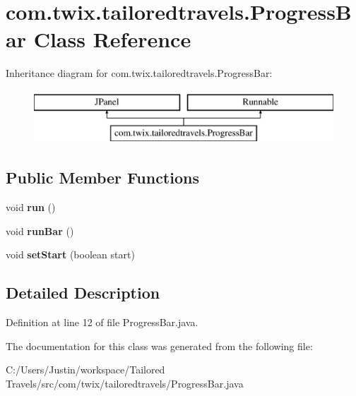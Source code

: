 \hypertarget{classcom_1_1twix_1_1tailoredtravels_1_1_progress_bar}{\section{com.\-twix.\-tailoredtravels.\-Progress\-Bar Class Reference}
\label{classcom_1_1twix_1_1tailoredtravels_1_1_progress_bar}
}
Inheritance diagram for com.\-twix.\-tailoredtravels.\-Progress\-Bar\-:\begin{figure}[H]
\begin{center}
\leavevmode
\includegraphics[height=2.000000cm]{classcom_1_1twix_1_1tailoredtravels_1_1_progress_bar}
\end{center}
\end{figure}
\subsection*{Public Member Functions}
\begin{DoxyCompactItemize}
\item 
\hypertarget{classcom_1_1twix_1_1tailoredtravels_1_1_progress_bar_a8802d9d9a03e351ab06e2aaab77e8667}{void {\bfseries run} ()}\label{classcom_1_1twix_1_1tailoredtravels_1_1_progress_bar_a8802d9d9a03e351ab06e2aaab77e8667}

\item 
\hypertarget{classcom_1_1twix_1_1tailoredtravels_1_1_progress_bar_a811166dd9c9e35124583d224f9c1b308}{void {\bfseries run\-Bar} ()}\label{classcom_1_1twix_1_1tailoredtravels_1_1_progress_bar_a811166dd9c9e35124583d224f9c1b308}

\item 
\hypertarget{classcom_1_1twix_1_1tailoredtravels_1_1_progress_bar_af3976bd1a762e92eba57524cf65fe400}{void {\bfseries set\-Start} (boolean start)}\label{classcom_1_1twix_1_1tailoredtravels_1_1_progress_bar_af3976bd1a762e92eba57524cf65fe400}

\end{DoxyCompactItemize}


\subsection{Detailed Description}


Definition at line 12 of file Progress\-Bar.\-java.



The documentation for this class was generated from the following file\-:\begin{DoxyCompactItemize}
\item 
C\-:/\-Users/\-Justin/workspace/\-Tailored Travels/src/com/twix/tailoredtravels/Progress\-Bar.\-java\end{DoxyCompactItemize}
